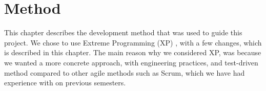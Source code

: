 
\chapter{Method}
\label{cha:method}

This chapter describes the development method that was used to guide this project. We chose to use Extreme Programming (XP) \parencite{xp}, with a few changes, which is described in this chapter. The main reason why we considered XP, was because we wanted a more concrete approach, with engineering practices, and test-driven method compared to other agile methods such as Scrum, which we have had experience with on previous semesters.


